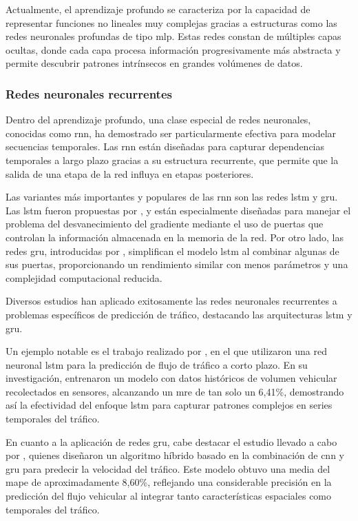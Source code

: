 Actualmente, el aprendizaje profundo se caracteriza por la capacidad de representar funciones no lineales muy complejas gracias a estructuras como las redes neuronales profundas de tipo \acrlong{mlp}. Estas redes constan de múltiples capas ocultas, donde cada capa procesa información progresivamente más abstracta y permite descubrir patrones intrínsecos en grandes volúmenes de datos.

\subsubsection{Redes neuronales recurrentes}

Dentro del aprendizaje profundo, una clase especial de redes neuronales, conocidas como \acrfull{rnn}, ha demostrado ser particularmente efectiva para modelar secuencias temporales. Las \acrshort{rnn} están diseñadas para capturar dependencias temporales a largo plazo gracias a su estructura recurrente, que permite que la salida de una etapa de la red influya en etapas posteriores.

Las variantes más importantes y populares de las \acrshort{rnn} son las redes \acrlong{lstm} y \acrlong{gru}. Las \acrshort{lstm} fueron propuestas por \cite{hochreiter1997long}, y están especialmente diseñadas para manejar el problema del desvanecimiento del gradiente mediante el uso de puertas que controlan la información almacenada en la memoria de la red. Por otro lado, las redes \acrshort{gru}, introducidas por \cite{cho2014gru}, simplifican el modelo \acrshort{lstm} al combinar algunas de sus puertas, proporcionando un rendimiento similar con menos parámetros y una complejidad computacional reducida.

Diversos estudios han aplicado exitosamente las redes neuronales recurrentes a problemas específicos de predicción de tráfico, destacando las arquitecturas \acrshort{lstm} y \acrshort{gru}.

Un ejemplo notable es el trabajo realizado por \cite{zhao2017lstm}, en el que utilizaron una red neuronal \acrshort{lstm} para la predicción de flujo de tráfico a corto plazo. En su investigación, entrenaron un modelo con datos históricos de volumen vehicular recolectados en sensores, alcanzando un \acrfull{mre} de tan solo un 6,41\%, demostrando así la efectividad del enfoque \acrshort{lstm} para capturar patrones complejos en series temporales del tráfico.

En cuanto a la aplicación de redes \acrshort{gru}, cabe destacar el estudio llevado a cabo por \cite{ma2022cnn_gru}, quienes diseñaron un algoritmo híbrido basado en la combinación de \acrshort{cnn} y \acrshort{gru} para predecir la velocidad del tráfico. Este modelo obtuvo una media del \acrshort{mape} de aproximadamente 8,60\%, reflejando una considerable precisión en la predicción del flujo vehicular al integrar tanto características espaciales como temporales del tráfico.

